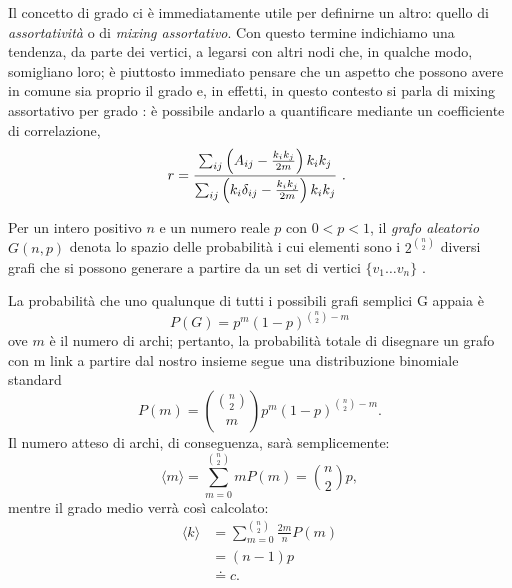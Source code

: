 Il concetto di grado ci è immediatamente utile per definirne un altro: quello di \emph{assortatività} o di \emph{mixing assortativo}.
 Con questo termine indichiamo una tendenza, da parte dei vertici, a legarsi con altri nodi che, in qualche modo, somigliano loro; è piuttosto immediato pensare che un aspetto che possono avere in comune sia proprio il grado e, in effetti, in questo contesto si parla di mixing assortativo per grado \cite{Newman}: è possibile andarlo a quantificare mediante un coefficiente di correlazione,
\begin{equation}
	r = \frac{ \sum_{ij} \left( A_{ij} - \frac{k_i k_j}{2m} \right) k_i k_j}{\sum_{ij} \left(k_i \delta_{ij} - \frac{k_i k_j}{2m} \right) k_i k_j} $ . $
\end{equation}

\medskip
\begin{definizione} 
Per un intero positivo $ n $ e un numero reale $ p $ con $ 0 < p < 1 $, il \emph{grafo aleatorio} $ G \left(n,p \right) $ denota lo spazio delle probabilità i cui elementi sono i $ 2^{\binom{n}{2}} $ diversi grafi che si possono generare a partire da un set di vertici $ \lbrace v_1 \dots v_n \rbrace $ \cite{Lesniak}.
\end{definizione}
La probabilità che uno qualunque di tutti i possibili grafi semplici G appaia è
\begin{equation}
P \left(G \right) = p^m \left( 1 - p \right)^{\binom{n}{2} - m}
\end{equation}
ove $ m $ è il numero di archi; pertanto, la probabilità totale di disegnare un grafo con m link a partire dal nostro insieme segue una distribuzione binomiale standard
\begin{equation}
P \left(m \right) = \binom{\binom{n}{2}}{m} p^m \left( 1 - p \right)^{\binom{n}{2} - m}.
\end{equation}
Il numero atteso di archi, di conseguenza, sarà semplicemente:
\[
\langle m \rangle = \sum_{m=0}^{\binom{n}{2}} m P \left(m \right) = \binom{n}{2} p,
\]
mentre il grado medio verrà così calcolato:
\[
\begin{split}
	\langle k \rangle &= \sum_{m=0}^{{\binom{n}{2}}} \frac{2m}{n} P \left(m \right) \\
		  &= \left( n - 1 \right) p \\
		  & \doteq c.
\end{split}
\] 